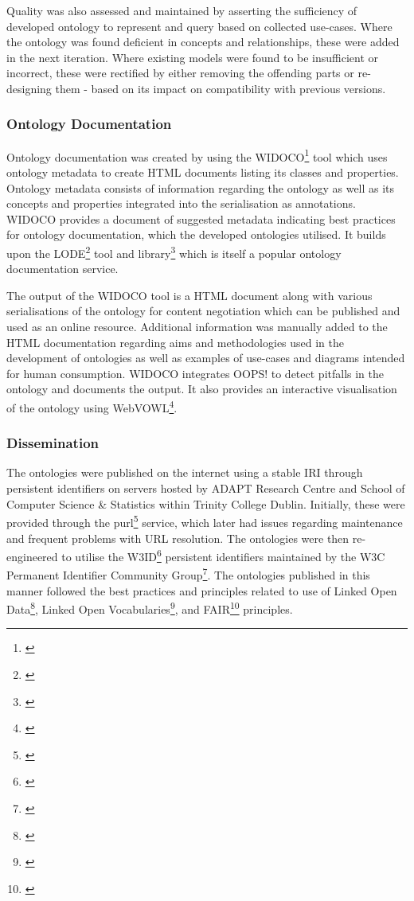 Quality was also assessed and maintained by asserting the sufficiency of developed ontology to represent and query based on collected use-cases. Where the ontology was found deficient in concepts and relationships, these were added in the next iteration. Where existing models were found to be insufficient or incorrect, these were rectified by either removing the offending parts or re-designing them - based on its impact on compatibility with previous versions.

\subsubsection*{Ontology Documentation}
Ontology documentation was created by using the WIDOCO\footnote{\url{}} \cite{} tool which uses ontology metadata to create HTML documents listing its classes and properties. Ontology metadata consists of information regarding the ontology as well as its concepts and properties integrated into the serialisation as annotations. WIDOCO provides a document of suggested metadata indicating best practices for ontology documentation, which the developed ontologies utilised. It builds upon the LODE\footnote{\url{}} tool and library\footnote{\url{}} which is itself a popular ontology documentation service.

The output of the WIDOCO tool is a HTML document along with various serialisations of the ontology for content negotiation which can be published and used as an online resource. Additional information was manually added to the HTML documentation regarding aims and methodologies used in the development of ontologies as well as examples of use-cases and diagrams intended for human consumption. WIDOCO integrates OOPS! to detect pitfalls in the ontology and documents the output. It also provides an interactive visualisation of the ontology using WebVOWL\footnote{\url{}}.

\subsubsection*{Dissemination}
The ontologies were published on the internet using a stable IRI through persistent identifiers on servers hosted by ADAPT Research Centre and School of Computer Science \& Statistics within Trinity College Dublin. Initially, these were provided through the purl\footnote{\url{}} service, which later had issues regarding maintenance and frequent problems with URL resolution. The ontologies were then re-engineered to utilise the W3ID\footnote{\url{}} persistent identifiers maintained by the W3C Permanent Identifier Community Group\footnote{\url{}}. The ontologies published in this manner followed the best practices and principles related to use of Linked Open Data\footnote{\url{}}, Linked Open Vocabularies\footnote{\url{}}, and FAIR\footnote{\url{}} principles.

